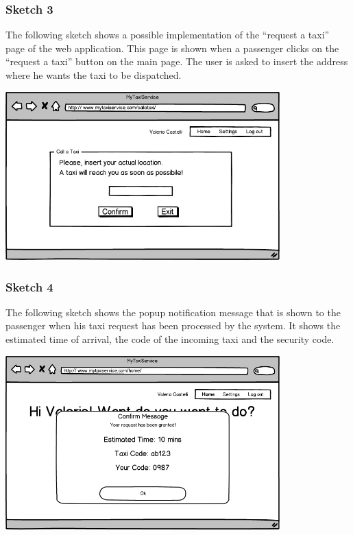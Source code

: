 \subsubsection*{Sketch 3}
The following sketch shows a possible implementation of the ``request a taxi'' page of the web application. This page is shown when a passenger clicks on the ``request a taxi'' button on the main page. The user is asked to insert the address where he wants the taxi to be dispatched.
\begin{center}
\includegraphics[width=300pt,keepaspectratio]{images/user_call.png}
\end{center}


\subsubsection*{Sketch 4}
The following sketch shows the popup notification message that is shown to the passenger when his taxi request has been processed by the system. It shows the estimated time of arrival, the code of the incoming taxi and the security code.
\begin{center}
\includegraphics[width=300pt,keepaspectratio]{images/user_confirm.png}
\end{center}

